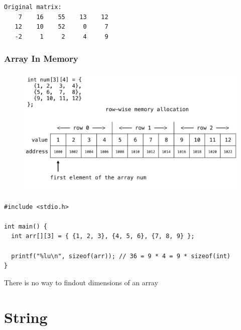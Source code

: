 \documentclass{../c-lecture}
\begin{document}
\begin{frame}[fragile]
  \begin{verbatim}
Original matrix:
    7    16    55    13    12
   12    10    52     0     7
   -2     1     2     4     9
  \end{verbatim}
\end{frame}

\begin{frame}
  \frametitle{Array In Memory}
  \begin{figure}
    \includegraphics[width=.75\textwidth]{./img/arrays-in-memory.png}
  \end{figure}
\end{frame}

\begin{frame}[fragile]
  \begin{verbatim}
#include <stdio.h>

int main() {
  int arr[][3] = { {1, 2, 3}, {4, 5, 6}, {7, 8, 9} };

  printf("%lu\n", sizeof(arr)); // 36 = 9 * 4 = 9 * sizeof(int)
}
  \end{verbatim}
  \begin{block}{}
    There is no way to findout dimensions of an array
  \end{block}
\end{frame}

\section{String}
\end{document}
